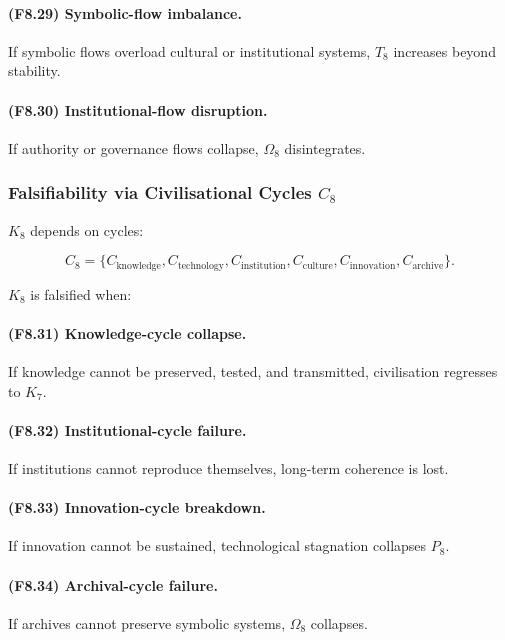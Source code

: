 \paragraph{(F8.29) Symbolic-flow imbalance.}
If symbolic flows overload cultural or institutional systems,
$T_8$ increases beyond stability.

\paragraph{(F8.30) Institutional-flow disruption.}
If authority or governance flows collapse,
$\Omega_8$ disintegrates.



\subsubsection{Falsifiability via Civilisational Cycles \texorpdfstring{$C_8$}{C_8}}

$K_8$ depends on cycles:

\[
C_8 = \{
C_{\mathrm{knowledge}},
C_{\mathrm{technology}},
C_{\mathrm{institution}},
C_{\mathrm{culture}},
C_{\mathrm{innovation}},
C_{\mathrm{archive}}
\}.
\]

$K_8$ is falsified when:

\paragraph{(F8.31) Knowledge-cycle collapse.}
If knowledge cannot be preserved, tested, and transmitted,
civilisation regresses to $K_7$.

\paragraph{(F8.32) Institutional-cycle failure.}
If institutions cannot reproduce themselves,
long-term coherence is lost.

\paragraph{(F8.33) Innovation-cycle breakdown.}
If innovation cannot be sustained,
technological stagnation collapses $P_8$.

\paragraph{(F8.34) Archival-cycle failure.}
If archives cannot preserve symbolic systems,
$\Omega_8$ collapses.

